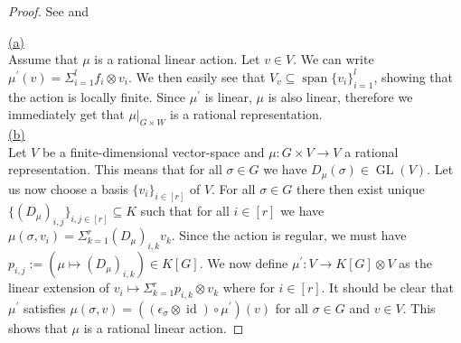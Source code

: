 \begin{proof}
  See \cite[A.1.8]{DK15} and \cite[2.2.5, 2.2.6]{DK15}

  \underline{(a)}\\
  Assume that $\mu$ is a rational linear action.
  Let $v \in V$.
  We can write $\mu^\prime (v) = \Sigma_{i=1}^l f_i \otimes v_i$. %
  We then easily see that $V_v \subseteq \operatorname{span}\{v_i\}_{i=1}^l$, showing that the action is locally finite.
  Since $\mu^\prime$ is linear, $\mu$ is also linear, therefore we immediately get that $\left. \mu \right|_{G\times W}$ is a rational representation.\\
  \underline{(b)}\\
  Let $V$ be a finite-dimensional vector-space and $\mu \colon G \times V \longrightarrow V$ a rational representation.
  This means that for all $\sigma \in G$ we have $D_\mu (\sigma) \in \operatorname{GL}(V)$.
  Let us now choose a basis $\{v_i\}_{i \in [r]}$ of $V$.
  For all $\sigma \in G$ there then exist unique $\{ \left( D_\mu \right)_{i,j}\}_{i,j \in [r]} \subseteq K$ such that for all $i \in [r]$ we have $\mu (\sigma,v_i) = \Sigma_{k=1}^r \left(D_\mu\right)_{i,k} v_k$.
  Since the action is regular, we must have $p_{i,j} := \left( \mu \mapsto \left(D_\mu\right)_{i,k}\right) \in K[G]$.
  We now define $\mu^\prime \colon V \longrightarrow K[G] \otimes V$ as the linear extension of $v_i \mapsto \Sigma_{k=1}^r p_{i,k} \otimes v_k$ where for $i \in [r]$.
  It should be clear that $\mu^\prime$ satisfies $ \mu \left( \sigma , v \right) = \left( \left( \epsilon_\sigma \otimes \operatorname{id} \right) \circ \mu^\prime \right) \left(v\right) $ for all $\sigma \in G$ and $v \in V$.
  This shows that $\mu$ is a rational linear action.
  \end{proof}

